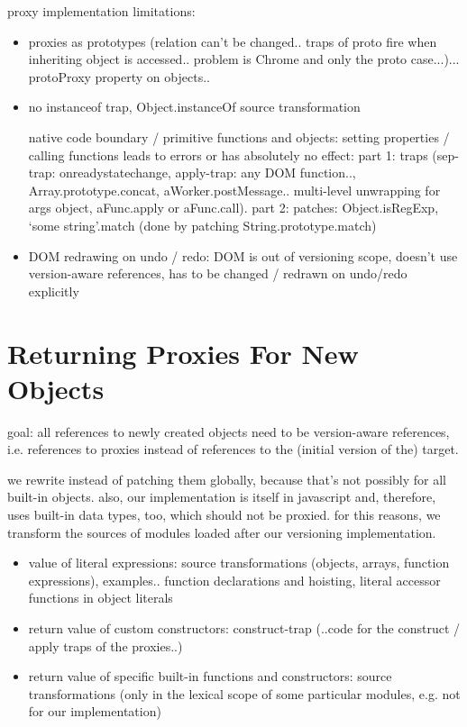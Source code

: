 proxy implementation limitations: 
\begin{itemize}
    \item proxies as prototypes (relation can’t be changed.. traps of proto fire when inheriting object is accessed.. problem is Chrome and only the proto case...)... protoProxy property on objects..
    \item no instanceof trap, Object.instanceOf source transformation 
    \item [native code] boundary / primitive functions and objects: setting properties / calling functions leads to errors or has absolutely no effect: part 1: traps (sep-trap: onreadystatechange, apply-trap: any DOM function.., Array.prototype.concat, aWorker.postMessage.. multi-level unwrapping for args object, aFunc.apply or aFunc.call).
part 2: patches: Object.isRegExp, ‘some string’.match (done by patching String.prototype.match)
\end{itemize}


\begin{itemize}
    \item DOM redrawing on undo / redo: DOM is out of versioning scope, doesn’t use version-aware references, has to be changed / redrawn on undo/redo explicitly
\end{itemize}




\section{Returning Proxies For New Objects}

goal: all references to newly created objects need to be version-aware references, i.e. references to proxies instead of references to the (initial version of the) target. 

we rewrite instead of patching them globally, because that's not possibly for all built-in objects.
also, our implementation is itself in javascript and, therefore, uses built-in data types, too, which should not be proxied.
for this reasons, we transform the sources of modules loaded after our versioning implementation.

\begin{itemize}
    \item value of literal expressions: source transformations (objects, arrays, function expressions), examples.. function declarations and hoisting, literal accessor functions in object literals
    \item return value of custom constructors: construct-trap (..code for the construct / apply traps of the proxies..)
    \item return value of specific built-in functions and constructors: source transformations (only in the lexical scope of some particular modules, e.g. not for our implementation)
\end{itemize}

